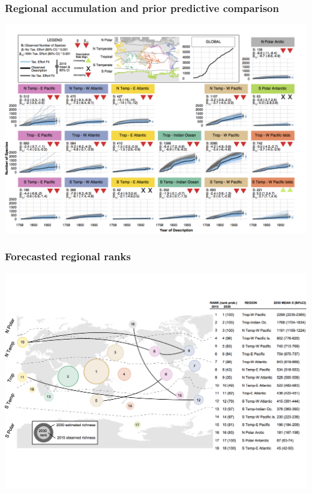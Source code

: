 \documentclass{beamer}
\begin{document}
\begin{frame}
  \frametitle{Regional accumulation and prior predictive comparison}

  \begin{center}
    \includegraphics[width=\textwidth,height=0.8\textheight,keepaspectratio=true]{figure/edie_cumm_regional}
  \end{center}

\end{frame}

\begin{frame}
  \frametitle{Forecasted regional ranks}

  \begin{center}
    \includegraphics[width=\textwidth,height=0.8\textheight,keepaspectratio=true]{figure/edie_rank}
  \end{center}

\end{frame}
\end{document}

